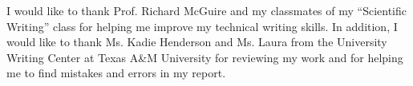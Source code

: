 \documentclass[letterpaper,12pt]{article}
\begin{document}
I would like to thank Prof. Richard McGuire and my classmates of my ``Scientific Writing'' class for helping me improve my technical writing skills. In addition, I would like to thank Ms. Kadie Henderson and Ms. Laura from the University Writing Center at Texas A\&M University for reviewing my work and for helping me to find mistakes and errors in my report. 

%





%
%
%
\appendix

{\linespread{1}

%

}
\end{document}
